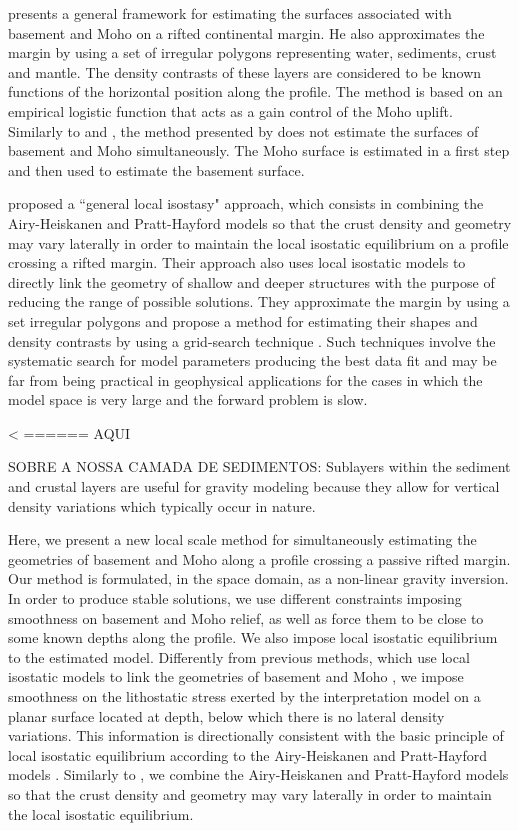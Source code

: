 \documentclass[manuscript]{geophysics}
\begin{document}
\citet{salem2017} presents a general framework for estimating the surfaces associated with
basement and Moho on a rifted continental margin.
He also approximates the margin by using a set of irregular polygons
representing water, sediments, crust and mantle.
The density contrasts of these layers are considered to be known functions
of the horizontal position along the profile.
The method is based on an empirical logistic function that acts as a gain control of the 
Moho uplift.
Similarly to \citet{salem-etal2014} and \citet{garcia-abdeslem2017}, the method presented
by \citet{salem2017} does not estimate the surfaces of basement and Moho simultaneously.
The Moho surface is estimated in a first step and then used to estimate the basement surface.

\citet{ferderer-etal2017} proposed a ``general local isostasy" approach, which consists
in combining the Airy-Heiskanen and Pratt-Hayford models so that the crust density and geometry 
may vary laterally in order to maintain the local isostatic equilibrium on a profile crossing
a rifted margin. Their approach also uses local isostatic models to directly link the geometry
of shallow and deeper structures with the purpose of reducing the range of 
possible solutions.
They approximate the margin by using a set irregular polygons and propose a method 
for estimating their shapes and density contrasts by using a grid-search technique \citep{sen-stoffa2013}.
Such techniques involve the systematic search for model parameters producing the best data fit
and may be far from being practical in geophysical applications for the cases in which
the model space is very large and the forward problem is slow.

< ====== AQUI

SOBRE A NOSSA CAMADA DE SEDIMENTOS: Sublayers within the sediment and crustal
layers are useful for gravity modeling because they allow
for vertical density variations which typically occur in
nature.

Here, we present a new local scale method for simultaneously estimating the geometries
of basement and Moho along a profile crossing a passive rifted margin.
Our method is formulated, in the space domain, as a non-linear gravity inversion.
In order to produce stable solutions,
we use different constraints imposing smoothness on basement and Moho relief, 
as well as force them to be close to some known depths along the profile. 
We also impose local isostatic equilibrium to the estimated model. 
Differently from previous methods, which use local isostatic models to link
the geometries of basement and Moho \citep[e.g.,][]{condi-etal1999, salem-etal2014},
we impose smoothness on the lithostatic stress exerted by the interpretation 
model on a planar surface located at depth, below which there is no lateral
density variations.
This information is directionally consistent with the basic principle of 
local isostatic equilibrium according to the Airy-Heiskanen and Pratt-Hayford models
\citep{heiskanen-moritz1967, lowrie2007}.
Similarly to \citet{ferderer-etal2017}, we combine the Airy-Heiskanen and Pratt-Hayford
models so that the crust density and geometry may vary laterally in order to maintain the 
local isostatic equilibrium.
\end{document}
